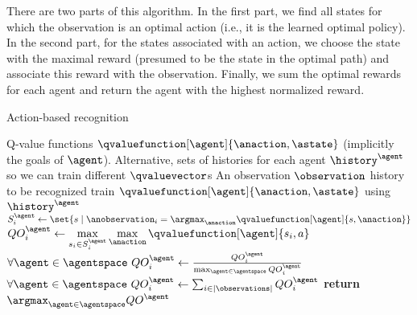 There are two parts of this algorithm. 
In the first part, we find all states for which the observation is an optimal action (i.e., it is the learned optimal policy). 
In the second part, for the states associated with an action, we choose the state with the maximal reward (presumed to be the state in the optimal path) and associate this reward with the observation. 
Finally, we sum the optimal rewards for each agent and return the agent with the highest normalized reward. 

\begin{algorithm}[H]
    \caption{Action-based recognition}
    \label{alg:action-recognition}
\begin{algorithmic}
    \Require Q-value functions $\qvaluefunction[\agent]{\anaction, \astate}$ (implicitly the goals of $\agent$). 
    \Require Alternative, sets of histories for each agent $\history^{\agent}$ so we can train different $\qvaluevector$s
    \Require An observation $\observation$ history to be recognized
    \State train $\qvaluefunction[\agent]{\anaction, \astate}$ using $\history^{\agent}$
        \ForAll{$\agent \in \agentspace$}
            \State $S^{\agent}_{i} \gets \set{s \mid \anobservation_{i} = \displaystyle\argmax_{\anaction}\qvaluefunction[\agent]{s, \anaction}}$
            \State $QO^{\agent}_{i} \gets \displaystyle\max_{s_i \in S^{\agent}_{i}}\max_{\anaction}\qvaluefunction[\agent]{s_{i},a}$
        \EndFor
        \State $\forall{\agent \in \agentspace}~QO^{\agent}_{i} \gets \frac{QO^{\agent}_{i}}{\max_{\agent \in \agentspace}QO^{\agent}_{i}}$ 
    \EndFor
    \State $\forall{\agent \in \agentspace}~QO^{\agent}_{i} \gets \sum_{i \in |\observations|} QO^{\agent}_{i}$
    \State \textbf{return} $\displaystyle\argmax_{\agent \in \agentspace}QO^{\agent}$
    \EndFunction
\end{algorithmic}
\end{algorithm}